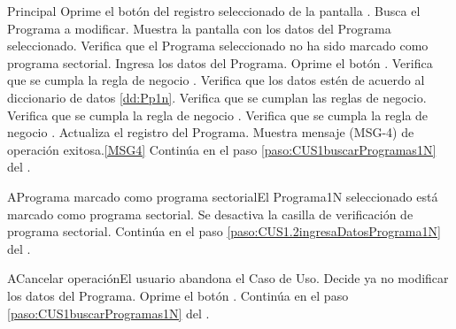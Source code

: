 	\begin{UCtrayectoria}{Principal}
                       \UCpaso[\UCactor] Oprime el bot\'on  del registro seleccionado de la pantalla .
                         \UCpaso [\UCactor] Busca el Programa a modificar.
			\UCpaso Muestra la pantalla  con los datos del Programa seleccionado.
			\UCpaso Verifica que el Programa seleccionado no ha sido marcado como programa sectorial.
			\UCpaso [\UCactor] Ingresa los datos del Programa.\label{paso:CUS1.2ingresaDatosPrograma1N}
			\UCpaso [\UCactor] Oprime el bot\'on .
			\UCpaso Verifica que se cumpla la regla de negocio .
			\UCpaso Verifica que los datos est\'en de acuerdo al diccionario de datos \ref{dd:Pp1n}. 
			\UCpaso Verifica que se cumplan las reglas de negocio. 
			\UCpaso Verifica que se cumpla la regla de negocio .  
			\UCpaso Verifica que se cumpla la regla de negocio .  
			\UCpaso Actualiza el registro del Programa.\label{paso:CUS1.2ActualizaDatosPrograma1N}
                        \UCpaso Muestra mensaje (MSG-4) de operación exitosa.\ref{MSG4}
			\UCpaso Contin\'ua en el paso \ref{paso:CUS1buscarProgramas1N} del .
	\end{UCtrayectoria}

		\begin{UCtrayectoriaA}{A}{Programa marcado como programa sectorial}{El Programa1N seleccionado est\'a marcado como programa sectorial.}
			\UCpaso Se desactiva la casilla de verificaci\'on de programa sectorial.
			\UCpaso Contin\'ua en el paso \ref{paso:CUS1.2ingresaDatosPrograma1N} del .
		\end{UCtrayectoriaA}

	\begin{UCtrayectoriaA}{A}{Cancelar operaci\'on}{El usuario abandona el Caso de Uso.}
			\UCpaso[\UCactor] Decide ya no modificar los datos del Programa.
			\UCpaso[\UCactor] Oprime el bot\'on .
			\UCpaso Contin\'ua en el paso \ref{paso:CUS1buscarProgramas1N} del .
	\end{UCtrayectoriaA}
		
